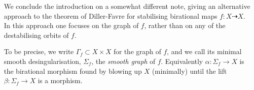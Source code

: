\documentclass[11pt, final]{amsart}
\newcommand{\dashto}{\dashrightarrow}
\newcommand{\sgraph}{\Sigma}
\begin{document}
We conclude the introduction on a somewhat different note, giving an alternative approach to the theorem of Diller-Favre for stabilising birational maps $f : X \dashto X$. In this approach one focuses on the graph of $f$, rather than on any of the destabilising orbits of $f$.


To be precise, we write $\Gamma_{\!f} \subset X \times X$ for the graph of $f$, and we call its minimal smooth desingularisation, $\sgraph_{\!f}$, the \emph{smooth graph} of $f$. Equivalently $\alpha : \sgraph_{\!f} \to X$ is the birational morphism found by blowing up $X$ (minimally) until the lift $\beta : \sgraph_{\!f} \to X$ is a morphism.
%
  \begin{center}
\end{center}
%
%
%
\end{document}
